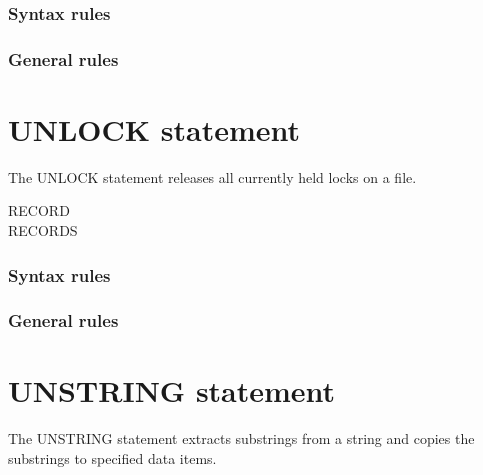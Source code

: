 \subsubsection{Syntax rules}

\subsubsection{General rules}

\section{UNLOCK statement}

The UNLOCK statement releases all currently held locks on a file.

\begin{syntax}
   \filename
  \begin{0-1}
    RECORD \\
    RECORDS
  \end{0-1}
\end{syntax}

\subsubsection{Syntax rules}

\subsubsection{General rules}

\section{UNSTRING statement}

The UNSTRING statement extracts substrings from a string and copies the substrings to specified data items.

